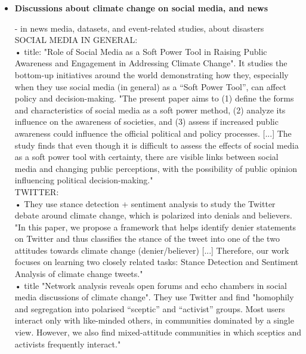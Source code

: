 \begin{itemize}



\item \textbf{Discussions about climate change on social media, and news}

- in news media, datasets, and event-related studies, about disasters\\

SOCIAL MEDIA IN GENERAL:\\

• \cite{mavrodieva2019role} title: "Role of Social Media as a Soft Power Tool in Raising Public Awareness and Engagement in Addressing Climate Change". It studies the bottom-up initiatives around the world demonstrating how they, especially when they use social media (in general) as a “Soft Power Tool”, can affect policy and decision-making. "The present paper aims to (1) define the forms and characteristics of social media as a soft power method, (2) analyze its influence on the awareness of societies, and (3) assess if increased public awareness could influence the official political and policy processes. [...] The study finds that even though it is difficult to assess the effects of social media as a soft power tool with certainty, there are visible links between social media and changing public perceptions, with the possibility of public opinion influencing political decision-making."\\

TWITTER:\\


• \cite{upadhyaya2023multi} They use stance detection + sentiment analysis to study the Twitter debate around climate change, which is polarized into denials and believers. "In this paper, we propose a framework that helps identify denier statements on Twitter and thus classifies the stance of the tweet into one of the two attitudes towards climate change (denier/believer) [...] Therefore, our work focuses on learning two closely related tasks: Stance Detection and Sentiment Analysis of climate change tweets." \\

• \cite{williams2015network} title "Network analysis reveals open forums and echo chambers in social media discussions of climate change". They use Twitter and find "homophily and segregation into polarised “sceptic” and “activist” groups. Most users interact only with like-minded others, in communities dominated by a single view. However, we also find mixed-attitude communities in which sceptics and activists frequently interact."\\


\end{itemize}

